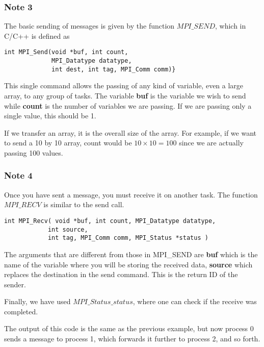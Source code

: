 \documentclass{beamer}
\begin{document}
\begin{frame}
\frametitle{Note 3}

\begin{block}{}

The basic sending of messages is given by the function $MPI\_SEND$, which in C/C++
is defined as 




\begin{verbatim}
int MPI_Send(void *buf, int count, 
             MPI_Datatype datatype, 
             int dest, int tag, MPI_Comm comm)}

\end{verbatim}

This single command allows the passing of any kind of variable, even a large array, to any group of tasks. 
The variable \textbf{buf} is the variable we wish to send while \textbf{count}
is the  number of variables we are passing. If we are passing only a single value, this should be 1. 

If we transfer an array, it is  the overall size of the array. 
For example, if we want to send a 10 by 10 array, count would be $10\times 10=100$ 
since we are  actually passing 100 values.  

\end{block}
\end{frame}

\begin{frame}
\frametitle{Note 4}

\begin{block}{}

Once you have  sent a message, you must receive it on another task. The function $MPI\_RECV$
is similar to the send call.




\begin{verbatim}
int MPI_Recv( void *buf, int count, MPI_Datatype datatype, 
            int source, 
            int tag, MPI_Comm comm, MPI_Status *status )

\end{verbatim}


The arguments that are different from those in MPI\_SEND are
\textbf{buf} which  is the name of the variable where you will  be storing the received data, 
\textbf{source} which  replaces the destination in the send command. This is the return ID of the sender.

Finally,  we have used  $MPI\_Status\_status$,  
where one can check if the receive was completed.

The output of this code is the same as the previous example, but now
process 0 sends a message to process 1, which forwards it further
to process 2, and so forth.

\end{block}
\end{frame}
\end{document}
